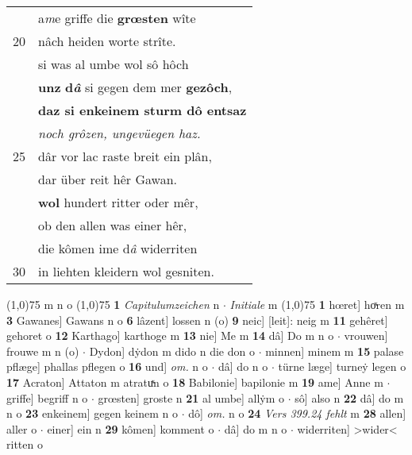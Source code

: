 \documentclass[8pt,a4paper,notitlepage]{article}
\begin{document}
\begin{table}[ht]
\begin{minipage}[t]{0.5\linewidth}
\begin{tabular}{rl}
 & a\textit{m}e griffe die \textbf{grœsten} wîte\\ 
20 & nâch heiden worte strîte.\\ 
 & si was al umbe wol sô hôch\\ 
 & \textbf{unz} \textbf{d\textit{â}} si gegen dem mer \textbf{gezôch},\\ 
 & \textbf{daz si enkeinem sturm dô entsaz}\\ 
 & \textit{noch grôzen, ungevüegen haz.}\\ 
25 & dâr vor lac raste breit ein plân,\\ 
 & dar über reit hêr Gawan.\\ 
 & \textbf{wol} hundert ritter oder mêr,\\ 
 & ob den allen was einer hêr,\\ 
 & die kômen ime d\textit{â} widerriten\\ 
30 & in liehten kleidern wol gesniten.\\ 
\end{tabular}
\scriptsize
\line(1,0){75} \newline
m n o \newline
\line(1,0){75} \newline
\textbf{1} \textit{Capitulumzeichen} n   $\cdot$ \textit{Initiale} m  \newline
\line(1,0){75} \newline
\textbf{1} hœret] hoͯren m \textbf{3} Gawanes] Gawans n o \textbf{6} lâzent] lossen n (o) \textbf{9} neic] [leit]: neig m \textbf{11} gehêret] gehoret o \textbf{12} Karthago] karthoge m \textbf{13} nie] Me m \textbf{14} dâ] Do m n o  $\cdot$ vrouwen] frouwe m n (o)  $\cdot$ Dydon] dẏdon m dido n die don o  $\cdot$ minnen] minem m \textbf{15} palase pflæge] phallas pflegen o \textbf{16} und] \textit{om.} n o  $\cdot$ dâ] do n o  $\cdot$ türne læge] turneẏ legen o \textbf{17} Acraton] Attaton m atratuͯn o \textbf{18} Babilonie] bapilonie m \textbf{19} ame] Anne m  $\cdot$ griffe] begriff n o  $\cdot$ grœsten] groste n \textbf{21} al umbe] allẏm o  $\cdot$ sô] also n \textbf{22} dâ] do m n o \textbf{23} enkeinem] gegen keinem n o  $\cdot$ dô] \textit{om.} n o \textbf{24} \textit{Vers 399.24 fehlt} m  \textbf{28} allen] aller o  $\cdot$ einer] ein n \textbf{29} kômen] komment o  $\cdot$ dâ] do m n o  $\cdot$ widerriten] >wider< ritten o \newline
\end{minipage}
\end{table}
\newpage
\end{document}
